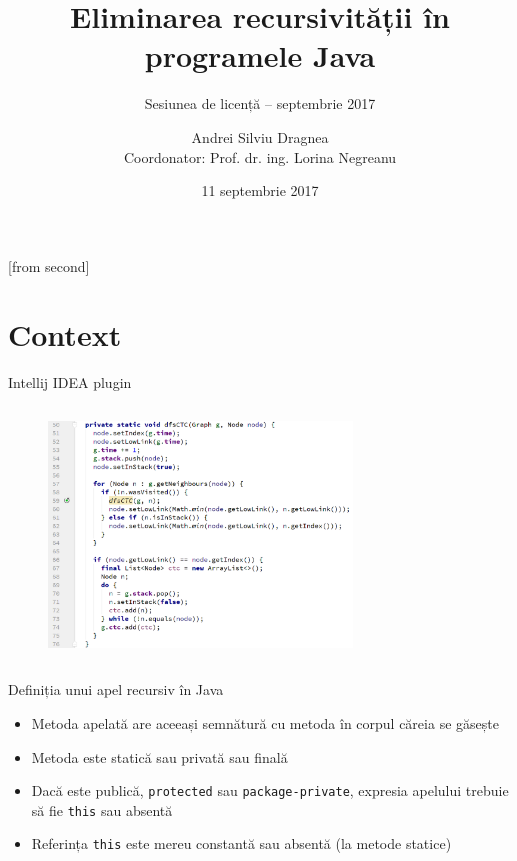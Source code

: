 \documentclass{beamer}
\title[Eliminarea recursivității în programele Java]{Eliminarea recursivității în programele Java}
\subtitle{Sesiunea de licență -- septembrie 2017}
\institute{Facultatea de Automatică și Calculatoare,\\
	Universitatea POLITEHNICA București}
\author[Andrei Silviu Dragnea]{Andrei Silviu Dragnea\\
	Coordonator: Prof. dr. ing. Lorina Negreanu}
\date{11 septembrie 2017}
\def\code#1{\texttt{#1}}
\begin{document}
[from second]


\frame{\titlepage}

\frame{\tableofcontents}

\section{Context}

\begin{frame}{Intellij IDEA plugin}
    \begin{columns}[T]
        \begin{column}{\textwidth}
            \begin{figure}
                \includegraphics[height=6cm]{img/highlight}
            \end{figure}
        \end{column}
    \end{columns}
\end{frame}

\begin{frame}{Definiția unui apel recursiv în Java}
    \begin{itemize}
        \item Metoda apelată are aceeași semnătură cu metoda în corpul căreia se găsește
        \item Metoda este statică sau privată sau finală
        \item Dacă este publică, \code{protected} sau \code{package-private}, expresia apelului trebuie să fie
        \code{this} sau absentă
        \item Referința \code{this} este mereu constantă sau absentă (la metode statice)
    \end{itemize}
\end{frame}
\end{document}
